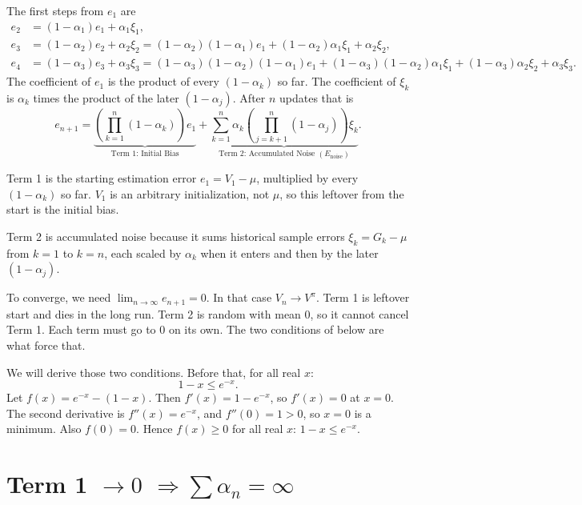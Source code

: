 The first steps from $e_1$ are
\[
\begin{aligned}
e_2
&=
(1-\alpha_1)e_1+\alpha_1\xi_1,\\
e_3
&=
(1-\alpha_2)e_2+\alpha_2\xi_2
=
(1-\alpha_2)(1-\alpha_1)e_1+(1-\alpha_2)\alpha_1\xi_1+\alpha_2\xi_2,\\
e_4
&=
(1-\alpha_3)e_3+\alpha_3\xi_3
=
(1-\alpha_3)(1-\alpha_2)(1-\alpha_1)e_1
+(1-\alpha_3)(1-\alpha_2)\alpha_1\xi_1
+(1-\alpha_3)\alpha_2\xi_2
+\alpha_3\xi_3.
\end{aligned}
\]
The coefficient of $e_1$ is the product of every $(1-\alpha_k)$ so far. The coefficient of $\xi_k$ is $\alpha_k$ times the product of the later $(1-\alpha_j)$. After $n$ updates that is
\begin{equation}
e_{n+1}
=
\underbrace{\left(\prod_{k=1}^{n}(1-\alpha_k)\right)e_1}_{\text{Term 1: Initial Bias}}
+
\underbrace{\sum_{k=1}^{n}\alpha_k\left(\prod_{j=k+1}^{n}(1-\alpha_j)\right)\xi_k}_{\text{Term 2: Accumulated Noise }(E_{\text{noise}})}.
\tag{D.5}
\end{equation}

Term 1 is the starting estimation error $e_1=V_1-\mu$, multiplied by every $(1-\alpha_k)$ so far. $V_1$ is an arbitrary initialization, not $\mu$, so this leftover from the start is the initial bias.

Term 2 is accumulated noise because it sums historical sample errors $\xi_k=G_k-\mu$ from $k=1$ to $k=n$, each scaled by $\alpha_k$ when it enters and then by the later $(1-\alpha_j)$.

To converge, we need $\lim_{n\to\infty}e_{n+1}=0$. In that case $V_n\to V^\pi$. Term 1 is leftover start and dies in the long run. Term 2 is random with mean $0$, so it cannot cancel Term 1. Each term must go to $0$ on its own. The two conditions of  below are what force that.

We will derive those two conditions. Before that, for all real $x$:
\begin{equation}
1-x\le e^{-x}.
\tag{D.6}
\end{equation}
Let $f(x)=e^{-x}-(1-x)$. Then $f'(x)=1-e^{-x}$, so $f'(x)=0$ at $x=0$. The second derivative is $f''(x)=e^{-x}$, and $f''(0)=1>0$, so $x=0$ is a minimum. Also $f(0)=0$. Hence $f(x)\ge 0$ for all real $x$: $1-x\le e^{-x}$.

\section{Term 1 $\to 0$ $\Rightarrow\sum\alpha_n=\infty$}

